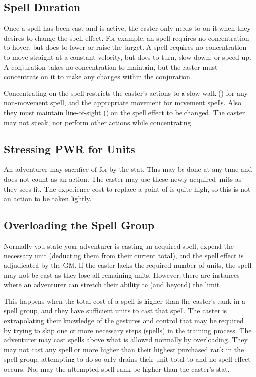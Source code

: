 \begin{multicols*}{2}
\subsection{Spell Duration}
Once a spell has been cast and is active, the caster only needs to  on it when they desires to change the spell effect. For example, an  spell requires no concentration to hover, but does to lower or raise the target. A  spell requires no concentration to move straight at a constant velocity, but does to turn, slow down, or speed up. A conjuration takes no concentration to maintain, but the caster must concentrate on it to make any changes within the conjuration.

Concentrating on the spell restricts the caster's actions to a slow walk () for any non-movement spell, and the appropriate movement for movement spells. Also they must maintain line-of-sight () on the spell effect to be changed. The caster may not speak, nor perform other actions while concentrating.
\subsection{Stressing PWR for Units}
An adventurer may sacrifice  of \PWR for  by  the stat. This may be done at any time and does not count as an action. The caster may use these newly acquired units as they sees fit. The experience cost to replace a point of \PWR is quite high, so this is not an action to be taken lightly.
\subsection{Overloading the Spell Group}
Normally you state your adventurer is casting an acquired spell, expend the necessary unit (deducting them from their current total), and the spell effect is adjudicated by the GM. If the caster lacks the required number of units, the spell may not be cast as they lose all remaining units. However, there are instances where an adventurer can stretch their ability to (and beyond) the limit.

This happens when the total cost of a spell is higher than the caster's rank in a spell group, and they have sufficient units to cast that spell. The caster is extrapolating their knowledge of the gestures and control that may be required by trying to skip one or more necessary steps (spells) in the training process. The adventurer may cast spells above what is allowed normally by overloading. They may not cast any spell  or more higher than their highest purchased rank in the spell group; attempting to do so only drains their unit total to  and no spell effect occurs. Nor may the attempted spell rank be higher than the caster's \PWR stat.


\end{multicols*}
